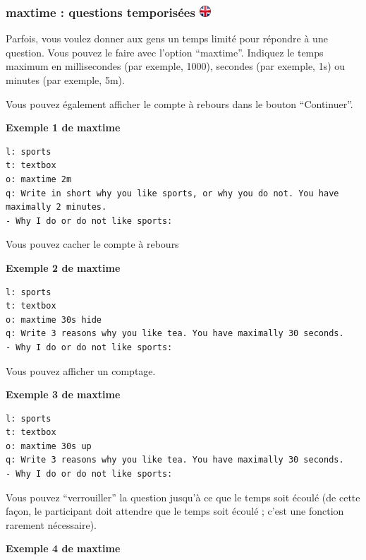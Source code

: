 \documentclass[
]{book}
\begin{document}
\hypertarget{maxtime-questions-temporisuxe9es-ukflag}{%
\subsubsection[maxtime : questions temporisées ]{\texorpdfstring{maxtime
: questions temporisées
\href{https://www.psytoolkit.org/doc3.1.0/online-survey-syntax.html\#maxtime}{\protect\includegraphics{img/ukflag.png}}}{maxtime : questions temporisées ukflag}}\label{maxtime-questions-temporisuxe9es-ukflag}}

Parfois, vous voulez donner aux gens un temps limité pour répondre à une
question. Vous pouvez le faire avec l'option ``maxtime''. Indiquez le
temps maximum en millisecondes (par exemple, 1000), secondes (par
exemple, 1s) ou minutes (par exemple, 5m).

Vous pouvez également afficher le compte à rebours dans le bouton
``Continuer''.

\textbf{Exemple 1 de maxtime}

\begin{verbatim}
l: sports
t: textbox
o: maxtime 2m
q: Write in short why you like sports, or why you do not. You have maximally 2 minutes.
- Why I do or do not like sports:
\end{verbatim}

Vous pouvez cacher le compte à rebours

\textbf{Exemple 2 de maxtime}

\begin{verbatim}
l: sports
t: textbox
o: maxtime 30s hide
q: Write 3 reasons why you like tea. You have maximally 30 seconds.
- Why I do or do not like sports:
\end{verbatim}

Vous pouvez afficher un comptage.

\textbf{Exemple 3 de maxtime}

\begin{verbatim}
l: sports
t: textbox
o: maxtime 30s up
q: Write 3 reasons why you like tea. You have maximally 30 seconds.
- Why I do or do not like sports:
\end{verbatim}

Vous pouvez ``verrouiller'' la question jusqu'à ce que le temps soit
écoulé (de cette façon, le participant doit attendre que le temps soit
écoulé ; c'est une fonction rarement nécessaire).

\textbf{Exemple 4 de maxtime}
\end{document}
